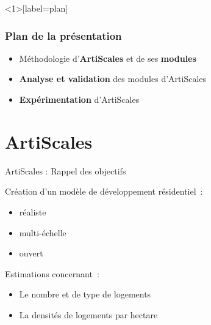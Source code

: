 \documentclass[xcolor=table]{beamer}
\begin{document}


\begin{frame}<1>[label=plan]
\frametitle{Plan de la présentation}
	\begin{itemize}
		\item \alert<1>{Méthodologie d'\textbf{ArtiScales} et de ses \textbf{modules}}
		\item \alert<2>{\textbf{Analyse et validation} des modules d'ArtiScales}
		\item \alert<3>{\textbf{Expérimentation} d'ArtiScales}
	\end{itemize}
\end{frame}


\section{ArtiScales}

\begin{frame}{ArtiScales : Rappel des objectifs}
		\begin{block}{}
		Création d'un modèle de développement résidentiel~:
		\begin{itemize}
			\small
			\item réaliste %
			\item multi-échelle %
			\item ouvert %
		\end{itemize}
	\end{block}
\begin{block}{}
	Estimations concernant~:
	\begin{itemize}
		\item Le nombre et de type de logements
		\item La densités de logements par hectare
	\end{itemize}
\end{block}
\end{frame}
\end{document}
